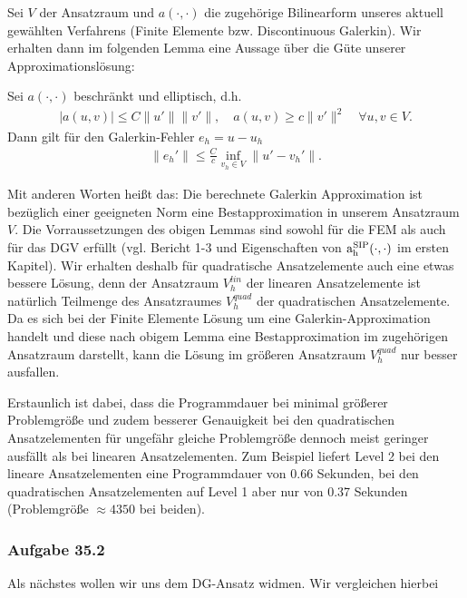 Sei $V$ der Ansatzraum und $a(\cdot,\cdot)$ die zugehörige Bilinearform unseres aktuell gewählten Verfahrens (Finite Elemente bzw. Discontinuous Galerkin).
Wir erhalten dann im folgenden Lemma eine Aussage über die Güte unserer Approximationslösung:

\begin{Lemma}
  Sei $a(\cdot,\cdot)$ beschränkt und elliptisch, d.h.
  \begin{align*}
    |a(u,v)| \le C \|u'\| \|v'\|, \quad a(u,v) \ge c \| v'\|^2
    \quad \forall u,v \in V.
  \end{align*}
  Dann gilt für den Galerkin-Fehler $e_h = u-u_h$
  \begin{align*}
    \| e_h' \| \le \frac{C}{c} \inf\limits_{v_h \in V}
    \| u'-v_h' \|.
  \end{align*}
\end{Lemma}
Mit anderen Worten heißt das: Die berechnete Galerkin Approximation ist bezüglich einer geeigneten Norm eine Bestapproximation in unserem Ansatzraum $V$.
Die Vorraussetzungen des obigen Lemmas sind sowohl für die FEM als auch für das DGV erfüllt (vgl. Bericht 1-3 und
Eigenschaften von $ \operatorname{a_h^{\text{SIP}}}(\cdot,\cdot) $ im ersten Kapitel).
Wir erhalten deshalb für quadratische Ansatzelemente auch eine etwas bessere Lösung, denn der Ansatzraum $V_h^{lin}$ der linearen Ansatzelemente ist natürlich Teilmenge des Ansatzraumes $V_h^{quad}$ der quadratischen Ansatzelemente. Da es sich bei der Finite Elemente Lösung um eine Galerkin-Approximation handelt und diese nach obigem Lemma eine Bestapproximation im zugehörigen Ansatzraum darstellt, kann die Lösung im größeren Ansatzraum $V_h^{quad}$ nur besser ausfallen.

Erstaunlich ist dabei, dass die Programmdauer bei minimal größerer Problemgröße und zudem besserer Genauigkeit bei den quadratischen Ansatzelementen für ungefähr gleiche Problemgröße dennoch meist geringer ausfällt als bei linearen Ansatzelementen. Zum Beispiel liefert Level 2 bei den lineare Ansatzelementen eine Programmdauer von 0.66 Sekunden, bei den quadratischen Ansatzelementen auf Level 1 aber nur von 0.37 Sekunden (Problemgröße $\approx 4350$ bei beiden).



\subsubsection{Aufgabe 35.2}
Als nächstes wollen wir uns dem DG-Ansatz widmen. Wir vergleichen hierbei  

